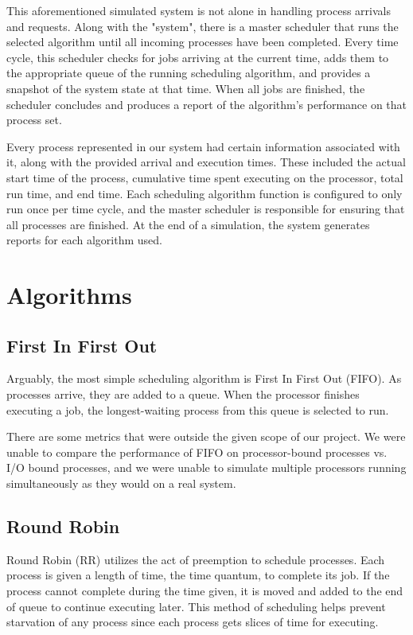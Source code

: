 \documentclass[conference,11pt]{IEEEtran}
\begin{document}
This aforementioned simulated system is not alone in handling process arrivals and requests. Along with the "system", there is a master scheduler that runs the selected algorithm until all incoming processes have been completed. Every time cycle, this scheduler checks for jobs arriving at the current time, adds them to the appropriate queue of the running scheduling algorithm, and provides a snapshot of the system state at that time. When all jobs are finished, the scheduler concludes and produces a report of the algorithm's performance on that process set.

Every process represented in our system had certain information associated with it, along with the provided arrival and execution times. These included the actual start time of the process, cumulative time spent executing on the processor, total run time, and end time. Each scheduling algorithm function is configured to only run once per time cycle, and the master scheduler is responsible for ensuring that all processes are finished. At the end of a simulation, the system generates reports for each algorithm used.

\section{Algorithms}

\subsection{First In First Out}
Arguably, the most simple scheduling algorithm is First In First Out (FIFO). As processes arrive, they are added to a queue. When the processor finishes executing a job, the longest-waiting process from this queue is selected to run.

There are some metrics that were outside the given scope of our project. We were unable to compare the performance of FIFO on processor-bound processes vs. I/O bound processes, and we were unable to simulate multiple processors running simultaneously as they would on a real system.

\subsection{Round Robin}
Round Robin (RR) utilizes the act of preemption to schedule processes. Each process is given a length of time, the time quantum, to complete its job. If the process cannot complete during the time given, it is moved and added to the end of queue to continue executing later. This method of scheduling helps prevent starvation of any process since each process gets slices of time for executing.
\end{document}
